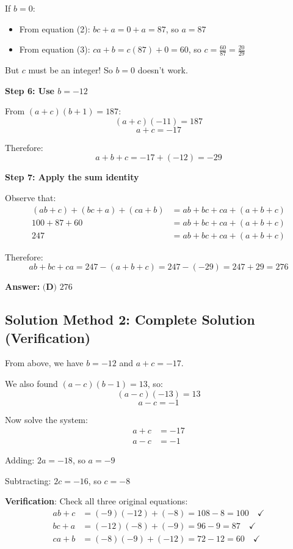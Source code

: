 \documentclass[12pt]{article}
\begin{document}
If $b = 0$:
\begin{itemize}
    \item From equation (2): $bc + a = 0 + a = 87$, so $a = 87$
    \item From equation (3): $ca + b = c(87) + 0 = 60$, so $c = \frac{60}{87} = \frac{20}{29}$
\end{itemize}

But $c$ must be an integer! So $b = 0$ doesn't work.

\textbf{Step 6: Use $b = -12$}

From $(a+c)(b+1) = 187$:
\[(a+c)(-11) = 187\]
\[a + c = -17\]

Therefore:
\[a + b + c = -17 + (-12) = -29\]

\textbf{Step 7: Apply the sum identity}

Observe that:
\begin{align*}
(ab+c) + (bc+a) + (ca+b) &= ab + bc + ca + (a+b+c)\\
100 + 87 + 60 &= ab + bc + ca + (a+b+c)\\
247 &= ab + bc + ca + (a+b+c)
\end{align*}

Therefore:
\[ab + bc + ca = 247 - (a+b+c) = 247 - (-29) = 247 + 29 = 276\]

\textbf{Answer: } $\boxed{\textbf{(D) } 276}$

\subsection*{Solution Method 2: Complete Solution (Verification)}

From above, we have $b = -12$ and $a+c = -17$.

We also found $(a-c)(b-1) = 13$, so:
\[(a-c)(-13) = 13\]
\[a - c = -1\]

Now solve the system:
\begin{align*}
a + c &= -17\\
a - c &= -1
\end{align*}

Adding: $2a = -18$, so $a = -9$

Subtracting: $2c = -16$, so $c = -8$

\textbf{Verification}: Check all three original equations:
\begin{align*}
ab + c &= (-9)(-12) + (-8) = 108 - 8 = 100 \quad \checkmark\\
bc + a &= (-12)(-8) + (-9) = 96 - 9 = 87 \quad \checkmark\\
ca + b &= (-8)(-9) + (-12) = 72 - 12 = 60 \quad \checkmark
\end{align*}
\end{document}
